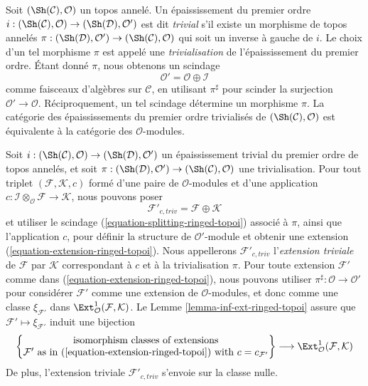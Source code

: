 \begin{remark}
\label{remark-trivial-thickening-ringed-topoi}
Soit $(\Sh(\mathcal{C}), \mathcal{O})$ un topos annelé. Un épaississement du
premier ordre $i : (\Sh(\mathcal{C}), \mathcal{O}) \to
(\Sh(\mathcal{D}), \mathcal{O}')$ est dit {\it trivial} s'il existe un
morphisme de topos annelés
$\pi : (\Sh(\mathcal{D}), \mathcal{O}') \to (\Sh(\mathcal{C}), \mathcal{O})$
qui soit un inverse à gauche de $i$. Le choix d'un tel morphisme $\pi$ est
appelé une {\it trivialisation} de l'épaississement du premier ordre.
Étant donné $\pi$, nous obtenons un scindage
\begin{equation}
\label{equation-splitting-ringed-topoi}
\mathcal{O}' = \mathcal{O} \oplus \mathcal{I}
\end{equation}
comme faisceaux d'algèbres sur $\mathcal{C}$, en utilisant $\pi^\sharp$ pour
scinder la surjection $\mathcal{O}' \to \mathcal{O}$.
Réciproquement, un tel scindage détermine un morphisme $\pi$. La catégorie des
épaississements du premier ordre trivialisés de
$(\Sh(\mathcal{C}), \mathcal{O})$ est équivalente à la catégorie des
$\mathcal{O}$-modules.
\end{remark}

\begin{remark}
\label{remark-trivial-extension-ringed-topoi}
Soit $i : (\Sh(\mathcal{C}), \mathcal{O}) \to (\Sh(\mathcal{D}), \mathcal{O}')$
un épaississement trivial du premier ordre de topos annelés, et soit
$\pi : (\Sh(\mathcal{D}), \mathcal{O}') \to
(\Sh(\mathcal{C}), \mathcal{O})$ une trivialisation. Pour tout triplet
$(\mathcal{F}, \mathcal{K}, c)$ formé d'une paire de $\mathcal{O}$-modules et
d'une application
$c : \mathcal{I} \otimes_\mathcal{O} \mathcal{F} \to \mathcal{K}$,
nous pouvons poser
$$
\mathcal{F}'_{c, triv} = \mathcal{F} \oplus \mathcal{K}
$$
et utiliser le scindage (\ref{equation-splitting-ringed-topoi}) associé à
$\pi$, ainsi que l'application $c$, pour définir la structure de
$\mathcal{O}'$-module et obtenir une extension
(\ref{equation-extension-ringed-topoi}).
Nous appellerons $\mathcal{F}'_{c, triv}$ l'{\it extension triviale} de
$\mathcal{F}$ par $\mathcal{K}$ correspondant à $c$ et à la trivialisation
$\pi$. Pour toute extension $\mathcal{F}'$ comme dans
(\ref{equation-extension-ringed-topoi}), nous pouvons utiliser
$\pi^\sharp : \mathcal{O} \to \mathcal{O}'$ pour considérer $\mathcal{F}'$
comme une extension de $\mathcal{O}$-modules, et donc comme une classe
$\xi_{\mathcal{F}'}$ dans
$\Ext^1_\mathcal{O}(\mathcal{F}, \mathcal{K})$.
Le Lemme \ref{lemma-inf-ext-ringed-topoi} assure que
$\mathcal{F}' \mapsto \xi_{\mathcal{F}'}$ induit une bijection
$$
\left\{
\begin{matrix}
\text{isomorphism classes of extensions}\\
\mathcal{F}'\text{ as in (\ref{equation-extension-ringed-topoi}) with }
c = c_{\mathcal{F}'}
\end{matrix}
\right\}
\longrightarrow
\Ext^1_\mathcal{O}(\mathcal{F}, \mathcal{K})
$$
De plus, l'extension triviale $\mathcal{F}'_{c, triv}$ s'envoie sur la classe
nulle.
\end{remark}

